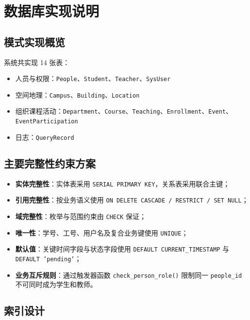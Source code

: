 \documentclass[11pt, a4paper]{article}
\begin{document}
\section{数据库实现说明}

\subsection{模式实现概览}

系统共实现 14 张表：
\begin{itemize}
    \item 人员与权限：\texttt{People}、\texttt{Student}、\texttt{Teacher}、\texttt{SysUser}
    \item 空间地理：\texttt{Campus}、\texttt{Building}、\texttt{Location}
    \item 组织课程活动：\texttt{Department}、\texttt{Course}、\texttt{Teaching}、\texttt{Enrollment}、\texttt{Event}、\texttt{EventParticipation}
    \item 日志：\texttt{QueryRecord}
\end{itemize}

\subsection{主要完整性约束方案}

\begin{itemize}
    \item \textbf{实体完整性}：实体表采用 \texttt{SERIAL PRIMARY KEY}，关系表采用联合主键；
    \item \textbf{引用完整性}：按业务语义使用 \texttt{ON DELETE CASCADE / RESTRICT / SET NULL}；
    \item \textbf{域完整性}：枚举与范围约束由 \texttt{CHECK} 保证；
    \item \textbf{唯一性}：学号、工号、用户名及复合业务键使用 \texttt{UNIQUE}；
    \item \textbf{默认值}：关键时间字段与状态字段使用 \texttt{DEFAULT CURRENT\_TIMESTAMP} 与 \texttt{DEFAULT 'pending'}；
    \item \textbf{业务互斥规则}：通过触发器函数 \texttt{check\_person\_role()} 限制同一 \texttt{people\_id} 不可同时成为学生和教师。
\end{itemize}

\subsection{索引设计}
\end{document}
